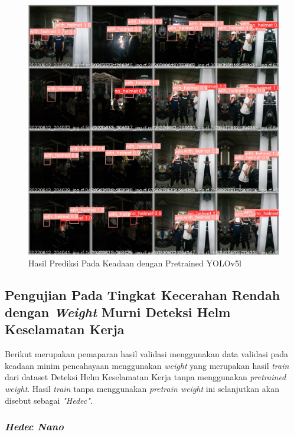 \begin{figure}[ht]
  \centering
  \includegraphics[scale=0.2]{gambar/train_v2_val/low_ligjt/yololarge/val_batch0_pred.jpg}
  \caption{Hasil Prediksi Pada Keadaan dengan Pretrained YOLOv5l}
\end{figure}

\newpage

\subsection{Pengujian Pada Tingkat Kecerahan Rendah dengan \emph{Weight} Murni Deteksi Helm Keselamatan Kerja}
\label{subsec:lowlight_pure}

\par Berikut merupakan pemaparan hasil validasi menggunakan data validasi pada keadaan minim pencahayaan menggunakan
\emph{weight} yang merupakan hasil \emph{train} dari dataset Deteksi Helm Keselamatan Kerja tanpa menggunakan \emph{pretrained weight}.
Hasil \emph{train} tanpa menggunakan \emph{pretrain weight} ini selanjutkan akan disebut sebagai \emph{"Hedec"}.


\subsubsection{\emph{Hedec Nano}}
\label{subsubsec:lowlight_hedecN}

